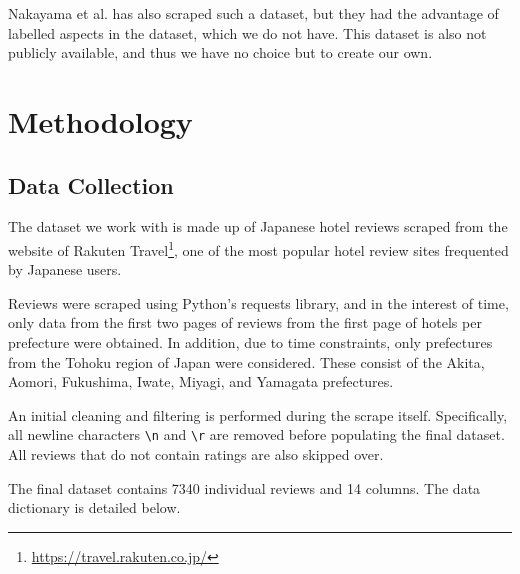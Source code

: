 \documentclass[12pt]{article}
\begin{document}
	Nakayama et al.\cite{nakayama-etal-2022-large} has also scraped such a dataset, but they had the advantage of labelled aspects in the dataset, which we do not have. This dataset is also not publicly available, and thus we have no choice but to create our own.
	
	\section{Methodology}
	
	\subsection{Data Collection}
	
	The dataset we work with is made up of Japanese hotel reviews scraped from the website of Rakuten Travel\footnote{\url{https://travel.rakuten.co.jp/}}, one of the most popular hotel review sites frequented by Japanese users.
	
	Reviews were scraped using Python's requests library, and in the interest of time, only data from the first two pages of reviews from the first page of hotels per prefecture were obtained. In addition, due to time constraints, only prefectures from the Tohoku region of Japan were considered. These consist of the Akita, Aomori, Fukushima, Iwate, Miyagi, and Yamagata prefectures.
	
	An initial cleaning and filtering is performed during the scrape itself. Specifically, all newline characters \verb*|\n| and \verb*|\r| are removed before populating the final dataset. All reviews that do not contain ratings are also skipped over. 
	
	The final dataset contains 7340 individual reviews and 14 columns. The data dictionary is detailed below.
	
\end{document}
